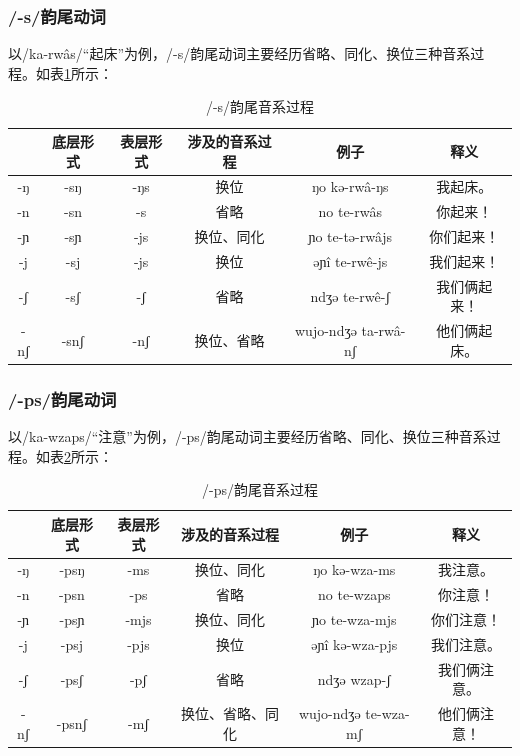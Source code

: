 \subsubsection{/-s/韵尾动词}

以/ka-rwâs/“起床”为例，/-s/韵尾动词主要经历省略、同化、换位三种音系过程。如表\ref{scodapro}所示：

\begin{table}[H]
\vspace{5pt}
    \centering
    \caption{/-s/韵尾音系过程}
    \label{scodapro}
\begin{tabular}{c|ccccc}
\toprule
    & 底层形式 & 表层形式 & 涉及的音系过程 & 例子                      & 释义     \\
\midrule
-ŋ  & -sŋ  & -ŋs  & 换位      & ŋo kə-rwâ-ŋs        & 我起床。   \\
-n  & -sn  & -s   & 省略      & no te-rwâs          & 你起来！   \\
-ɲ  & -sɲ  & -js  & 换位、同化   & ɲo te-tə-rwâjs      & 你们起来！  \\
-j  & -sj  & -js  & 换位      & əɲî te-rwê-js      & 我们起来！  \\
-ʃ  & -sʃ  & -ʃ   & 省略      & ndʒə te-rwê-ʃ       & 我们俩起来！ \\
-nʃ & -snʃ & -nʃ  & 换位、省略      & wujo-ndʒə ta-rwâ-nʃ & 他们俩起床。\\
\bottomrule
\end{tabular}
\end{table}

\subsubsection{/-ps/韵尾动词}

以/ka-wzaps/“注意”为例，/-ps/韵尾动词主要经历省略、同化、换位三种音系过程。如表\ref{pscodapro}所示：

\begin{table}[H]
\vspace{5pt}
    \centering
    \caption{/-ps/韵尾音系过程}
    \label{pscodapro}
\begin{tabular}{c|ccccc}
\toprule
    & 底层形式 & 表层形式 & 涉及的音系过程 & 例子                      & 释义     \\
\midrule
-ŋ  & -psŋ  & -ms  & 换位、同化   & ŋo kə-wza-ms        & 我注意。   \\
-n  & -psn  & -ps  & 省略      & no te-wzaps         & 你注意！   \\
-ɲ  & -psɲ  & -mjs & 换位、同化   & ɲo te-wza-mjs       & 你们注意！  \\
-j  & -psj  & -pjs & 换位      & əɲî kə-wza-pjs     & 我们注意。  \\
-ʃ  & -psʃ  & -pʃ  & 省略      & ndʒə wzap-ʃ         & 我们俩注意。 \\
-nʃ & -psnʃ & -mʃ  & 换位、省略、同化   & wujo-ndʒə te-wza-mʃ & 他们俩注意！\\
\bottomrule
\end{tabular}
\end{table}

